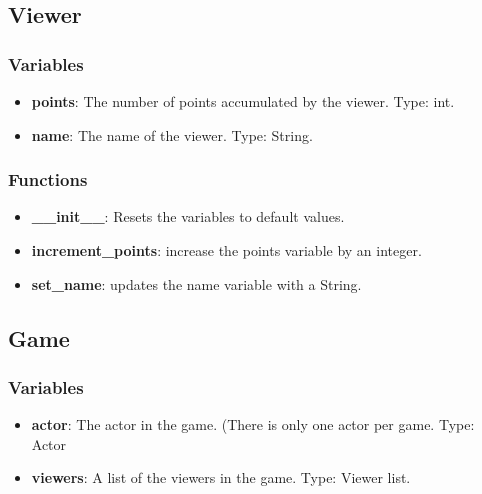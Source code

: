 \documentclass{article}
\begin{document}
\subsection{Viewer}
\subsubsection{Variables}

\begin{itemize}
	\item \textbf{points}: The number of points accumulated by the viewer. Type: int.

	\item \textbf{name}: The name of the viewer. Type: String.

\end{itemize}

\subsubsection{Functions}

\begin{itemize}

	\item \textbf{\_\_init\_\_}: Resets the variables to default values.

	\item \textbf{increment\_points}: increase the points variable by an integer.
	
	\item \textbf{set\_name}: updates the name variable with a String.
	
\end{itemize}

\subsection{Game}
\subsubsection{Variables}
\begin{itemize}
	\item \textbf{actor}: The actor in the game. (There is only one actor per game. Type: Actor
	
	\item \textbf{viewers}: A list of the viewers in the game. Type: Viewer list.
	
\end{itemize}
\end{document}
